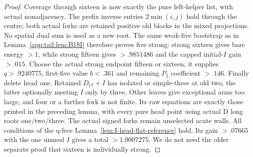 \documentclass[11pt]{article}
\theoremstyle{definition}
\theoremstyle{remark}
\begin{document}
\begin{proof}
Coverage through sixteen is now exactly the pure left-helper
list, with actual nonadjacency. The prefix inverse entries
$2\min(i,j)$ hold through the centre; both actual forks are
retained positive old blocks in the mixed projections.
No spatial dual sum is used as a new root.
The same weak-five bootstrap as in Lemma~\ref{app:tail:lem:B18I}
therefore proves five strong: strong sixteen gives bare energy
$>1$, while strong fifteen gives $>.9851486$ and the capped
initial-$I$ gain $>.015$.
Choose the actual strong endpoint fifteen or sixteen; it
supplies $q>.9240775$, first-five value $b<.361$ and remaining
$P_5$ coefficient $>.146$.
Finally delete head one. Retained $D_{17}+I$ has isolated
or simple-three at old two, the latter optionally meeting
$I$ only by three. Other leaves give exceptional arms too
large, and four or a further fork is not finite.
Its raw equations are exactly those printed in the preceding
lemma, with every pure head point using actual D long roots
one/two/three. The actual signed forks remain unselected
acute walls. All conditions of the q-free
Lemma~\ref{lem:I-head-flat-reference} hold.
Its gain $>.07665$ with the one unused $I$ gives a total
$>1.0007275$. We do not need the older separate proof that
sixteen is individually strong.
\end{proof}
\end{document}
